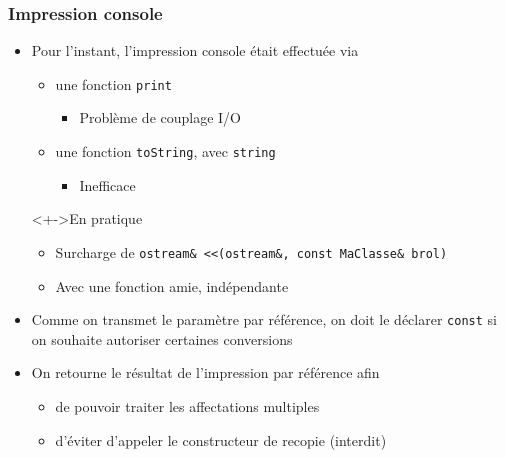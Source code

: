 \begin{frame}
\frametitle{Impression console}
\begin{itemize}[<+->]
\item Pour l'instant, l'impression console était effectuée via
	\begin{itemize}
	\item une fonction \texttt{print}
		\begin{itemize}
		\item Problème de couplage I/O
		\end{itemize}
	\item une fonction \texttt{toString}, avec \texttt{string}
		\begin{itemize}
		\item Inefficace
		\end{itemize}
	\end{itemize}
\begin{exampleblock}<+->{En pratique}
	\begin{itemize}[<+->]
	\item Surcharge de \texttt{ostream\& <<(ostream\&, const MaClasse\& brol)}
	\item Avec une fonction amie, indépendante
	\end{itemize}
\end{exampleblock}
\item Comme on transmet le paramètre par référence, on doit le déclarer \lstinline|const| si on souhaite autoriser certaines conversions
\item On retourne le résultat de l'impression par référence afin
	\begin{itemize}
	\item de pouvoir traiter les affectations multiples
	\item d'éviter d'appeler le constructeur de recopie (interdit)
	\end{itemize}
\end{itemize}
\end{frame}

